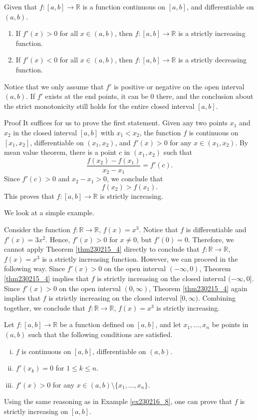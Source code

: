 \begin{theorem}[label=thm230215_4]{}
Given that $f:[a,b]\to\mathbb{R}$ is a function continuous on $[a,b]$, and differentiable on $(a, b)$.
\begin{enumerate}[1.]
\item If $f'(x)>0$ for all $x\in (a, b)$, then $f:[a,b]\to\mathbb{R}$ is a strictly increasing function.
\item If $f'(x)<0$ for all $x\in (a, b)$, then $f:[a,b]\to\mathbb{R}$ is a strictly decreasing function.
\end{enumerate}
\end{theorem}
Notice that we only assume that $f'$ is positive or negative on the open interval $(a, b)$. If $f'$ exists at the end points, it can be 0 there, and the conclusion about the strict monotonicity still holds for the entire closed interval $[a,b]$.
\begin{myproof}{Proof}
It suffices for us to prove the first statement. Given any two points $x_1$ and $x_2$ in the closed interval $[a,b]$ with $x_1<x_2$, the function $f$ is continuous on $[x_1, x_2]$, differentiable on $(x_1, x_2)$, and $f'(x)>0$ for any $x\in (x_1, x_2)$. By mean value theorem, there is a point $c$ in $(x_1, x_2)$ such that \bp
\[\frac{f(x_2)-f(x_1)}{x_2-x_1}=f'(c).\]  Since $f'(c)>0$ and $x_2-x_1>0$, we conclude that
\[f(x_2)>f(x_1).\]
This proves that $f:[a,b]\to\mathbb{R}$ is  strictly increasing.
\end{myproof}

We look at a simple example.
\begin{example}[label=ex230216_8]{}
Consider the function $f:\mathbb{R}\to\mathbb{R}$, $f(x)=x^3$. Notice that $f$ is differentiable and $f'(x)=3x^2$. Hence, $f'(x)>0$ for $x\neq 0$, but $f'(0)=0$. Therefore, we cannot apply Theorem \ref{thm230215_4} directly to conclude that $f:\mathbb{R}\to\mathbb{R}$, $f(x)=x^3$ is a strictly increasing function. However, we can proceed in the following way. Since $f'(x)>0$ on the open interval $(-\infty, 0)$, Theorem \ref{thm230215_4} implies that $f$ is strictly increasing on the closed interval $(-\infty, 0]$. Since  $f'(x)>0$ on the open interval $(0, \infty)$, Theorem \ref{thm230215_4} again implies that $f$ is strictly increasing on the closed interval $[0, \infty)$. Combining together, we conclude that  $f:\mathbb{R}\to\mathbb{R}$, $f(x)=x^3$ is strictly increasing.
\end{example}

\begin{remark}{}
Let   $f:[a, b]\to\mathbb{R}$ be a function defined on $[a, b]$, and let $x_1, \ldots, x_n$ be points in $(a, b)$ such that the following conditions are satisfied.
\begin{enumerate}[(i)]
\item $f$ is  continuous on $[a,b]$, differentiable on $(a, b)$.
\item   $f'(x_k)=0$ for $1\leq k\leq n$.
\item $f'(x)>0$ for any $x\in (a, b)\setminus\{x_1, \ldots, x_n\}$.
\end{enumerate}
Using the same reasoning as in Example \ref{ex230216_8},  one can prove that $f$ is strictly increasing on $[a, b]$.
\end{remark}

